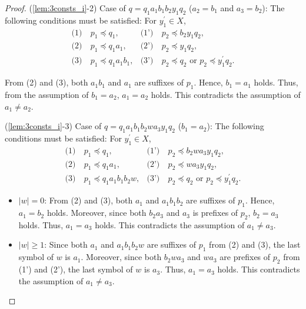 \begin{proof}
\smallskip

\noindent
(\ref{lem:3consts_i}-2) Case of $q=q_{1}a_{1}b_{1}b_{2}y_{1}q_{2}$ ($a_{2}=b_{1}$ and $a_{3}=b_{2}$):
The following conditions must be satisfied: For $y_{1}^{\prime} \in X$,
\begin{align*}
\textrm{(1)}~& p_{1} \preceq q_{1}, & \textrm{(1')}~& p_{2} \preceq b_{2}y_{1}q_{2}, \\
\textrm{(2)}~& p_{1} \preceq q_{1}a_{1}, & \textrm{(2')}~& p_{2} \preceq y_{1}q_{2}, \\
\textrm{(3)}~& p_{1} \preceq q_{1}a_{1}b_{1}, & \textrm{(3')}~& p_{2} \preceq q_{2} \mbox{~or~} p_{2} \preceq y_{1}^{\prime}q_{2}.
\end{align*}

From (2) and (3), {\color{red}both }$a_{1}b_{1}$ and $a_{1}$ are suffixes of $p_{1}$.
Hence, $b_{1}=a_{1}$ holds.
Thus, from the assumption of $b_{1}=a_{2}$, $a_{1}=a_{2}$ holds.
This contradicts the assumption of $a_{1} \ne a_{2}$.
\smallskip

\noindent
(\ref{lem:3consts_i}-3) Case of $q=q_{1}a_{1}b_{1}b_{2}wa_{3}y_{1}q_{2}$ ($b_{1}=a_{2}$):
The following conditions must be satisfied: For $y_{1}^{\prime} \in X$,
\begin{align*}
\textrm{(1)}~& p_{1} \preceq q_{1}, & \textrm{(1')}~& p_{2} \preceq b_{2}wa_{3}y_{1}q_{2}, \\
\textrm{(2)}~& p_{1} \preceq q_{1}a_{1}, & \textrm{(2')}~& p_{2} \preceq wa_{3}y_{1}q_{2}, \\
\textrm{(3)}~& p_{1} \preceq q_{1}a_{1}b_{1}b_{2}w, & \textrm{(3')}~& p_{2} \preceq q_{2} \mbox{~or~} p_{2} \preceq y_{1}^{\prime}q_{2}.
\end{align*}

\begin{itemize}
\item $|w|=0$: From (2) and (3), {\color{red}both }$a_{1}$ and $a_{1}b_{1}b_{2}$ are suffixes of $p_{1}$.
Hence, $a_{1}=b_{2}$ holds.
Moreover, since {\color{red}both }$b_{2}a_{3}$ and $a_{3}$ is prefixes of $p_{2}$, $b_{2}=a_{3}$ holds.
Thus, $a_{1}=a_{3}$ holds.
This contradicts the assumption of $a_{1} \ne a_{3}$.
%
\item $|w| \ge 1$: Since {\color{red}both }$a_{1}$ and $a_{1}b_{1}b_{2}w$ are suffixes of $p_{1}$ from (2) and (3),
the last symbol of $w$ is $a_{1}$.
Moreover, since {\color{red}both }$b_{2}wa_{3}$ and $wa_{3}$ are prefixes of $p_{2}$ from (1') and (2'),
the last symbol of $w$ is $a_{3}$.
Thus, $a_{1}=a_{3}$ holds.
This contradicts the assumption of $a_{1} \ne a_{3}$.
\end{itemize}


\end{proof}
